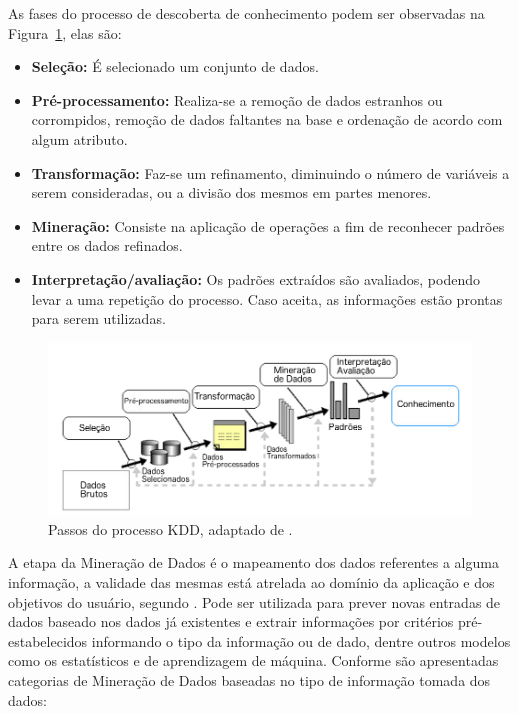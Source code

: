 \documentclass[article,11pt,oneside,a4paper]{abntex2} %
\begin{document}
	As fases do processo de descoberta de conhecimento podem ser observadas na Figura~\ref{kdd}, elas são:

	\begin{itemize}
	\item \textbf{Seleção:} É selecionado um conjunto de dados.
	\item \textbf{Pré-processamento:} Realiza-se a remoção de dados estranhos ou corrompidos, remoção de dados faltantes na base e ordenação de acordo com algum atributo.
	\item \textbf{Transformação:} Faz-se um refinamento, diminuindo o número de variáveis a serem consideradas, ou a divisão dos mesmos em partes menores.
	\item \textbf{Mineração:} Consiste na aplicação de operações a fim de reconhecer padrões entre os dados refinados.
	\item \textbf{Interpretação/avaliação:} Os padrões extraídos são avaliados, podendo levar a uma repetição do processo. Caso aceita, as informações estão prontas para serem utilizadas. 	
	\end{itemize}
	
	\begin{figure}[h!]
	{\centering
		\includegraphics[width=1\textwidth]{figuras/kdd2.png}
		\caption{Passos do processo KDD, adaptado de .}
		\label{kdd}
	}
	\end{figure}
	A etapa da Mineração de Dados é o mapeamento dos dados referentes a alguma informação, a validade das mesmas está atrelada ao domínio da aplicação e dos objetivos do usuário, segundo . Pode ser utilizada para prever novas entradas de dados baseado nos dados já existentes e extrair informações por critérios pré-estabelecidos informando o tipo da informação ou de dado, dentre outros modelos como os estatísticos e de aprendizagem de máquina. Conforme  são apresentadas categorias de Mineração de Dados baseadas no tipo de informação tomada dos dados: 
\end{document}
